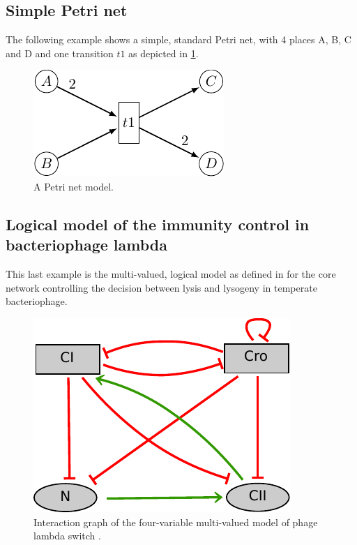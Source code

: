 \subsection{Simple Petri net} %
\label{sub:ex_pn}
The following example shows a simple, standard Petri net, with 4 places A, B, C and D and one transition $t1$ as depicted in \ref{ex-pn}.
\begin{figure}[hb]
  \includegraphics{figs/PN.pdf}
  \caption{A Petri net model.}
  \label{ex-pn}
\end{figure}





\bigskip
\subsection{Logical model of the immunity control in bacteriophage lambda}
\label{sub:ex_phage}
This last example is the multi-valued, logical model as defined in \cite{thieffry95} for the core network controlling the decision between lysis and lysogeny in temperate bacteriophage. 

\begin{figure}[hb]
  \includegraphics{figs/phage_lambda.pdf}
  \caption{Interaction graph of the four-variable multi-valued model of phage lambda switch \cite{thieffry95}.}
  \label{ex-phage}
\end{figure}






